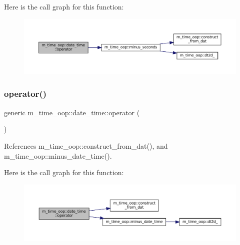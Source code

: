 Here is the call graph for this function\+:\nopagebreak
\begin{figure}[H]
\begin{center}
\leavevmode
\includegraphics[width=350pt]{structm__time__oop_1_1date__time_a1bc7a5d0ab4bd7539e7ec7bafd6dc572_cgraph}
\end{center}
\end{figure}
\mbox{\label{structm__time__oop_1_1date__time_a4c3515896bef8d410b6e010b033296c0}} 
\subsubsection{\texorpdfstring{operator()}{operator()}\hspace{0.1cm}{\footnotesize\ttfamily [9/9]}}
{\footnotesize\ttfamily generic m\+\_\+time\+\_\+oop\+::date\+\_\+time\+::operator (\begin{DoxyParamCaption}{ }\end{DoxyParamCaption})\hspace{0.3cm}{\ttfamily [private]}}



References m\+\_\+time\+\_\+oop\+::construct\+\_\+from\+\_\+dat(), and m\+\_\+time\+\_\+oop\+::minus\+\_\+date\+\_\+time().

Here is the call graph for this function\+:\nopagebreak
\begin{figure}[H]
\begin{center}
\leavevmode
\includegraphics[width=350pt]{structm__time__oop_1_1date__time_a4c3515896bef8d410b6e010b033296c0_cgraph}
\end{center}
\end{figure}
\mbox{\label{structm__time__oop_1_1date__time_aa096a6bd2457e5a9370f89e5e067dc27}} 
